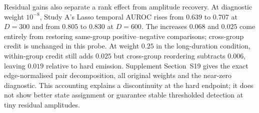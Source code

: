 Residual gains also separate a rank effect from amplitude recovery.
At diagnostic weight $10^{-8}$, Study A's Lasso temporal AUROC rises from
$0.639$ to $0.707$ at $D=300$ and from $0.805$ to $0.830$ at $D=600$.
The increases $0.068$ and $0.025$ come entirely from restoring same-group
positive--negative comparisons; cross-group credit is unchanged in this
probe. At weight $0.25$ in the long-duration condition, within-group credit
still adds $0.025$ but cross-group reordering subtracts $0.006$, leaving
$0.019$ relative to hard emission. Supplement Section~S19 gives the exact
edge-normalised pair decomposition, all original weights and the near-zero
diagnostic. This accounting explains a discontinuity at the hard endpoint;
it does not show better state assignment or guarantee stable thresholded
detection at tiny residual amplitudes.
